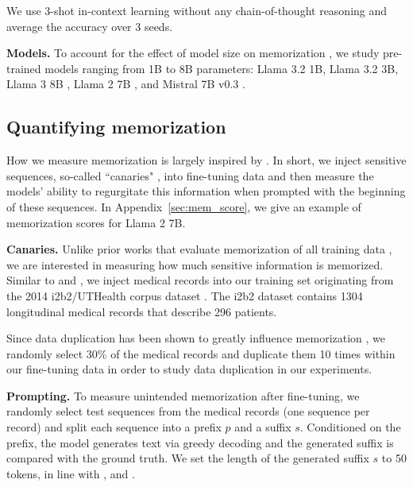 We use 3-shot in-context learning without any chain-of-thought reasoning and average the accuracy over 3 seeds.

\textbf{Models.} To account for the effect of model size on memorization \citep{memo, tirumala2022memorization}, we study pre-trained models ranging from 1B to 8B parameters: Llama 3.2 1B, Llama 3.2 3B, Llama 3 8B \citep{dubey2024llama}, Llama 2 7B \citep{touvron2023llama2}, and Mistral 7B v0.3 \citep{jiang2023mistral7b}.

\subsection{Quantifying memorization}
\label{sec:mem}
How we measure memorization is largely inspired by \citet{memo}. In short, we inject sensitive sequences, so-called ``canaries" \citep{carlini2019secret, jagielski2023forget, thakkar2020understanding}, into fine-tuning data and then measure the models' ability to regurgitate this information when prompted with the beginning of these sequences. In Appendix~\ref{sec:mem_score}, we give an example of memorization scores for Llama 2 7B.

\textbf{Canaries.} Unlike prior works that evaluate memorization of all training data \citep{memo, ippolito2023verbatim, hans2024goldfish}, we are interested in measuring how much sensitive information is memorized.
Similar to \citet{lehman2021does} and \citet{mireshghallah2022quantifying}, we inject medical records into our training set originating from the 2014 i2b2/UTHealth corpus dataset \citep{phi}. The i2b2 dataset contains 1304 longitudinal medical records that describe 296 patients.

Since data duplication has been shown to greatly influence memorization \citep{memo, lee2022dedup, kandpal2022dedup}, we randomly select 30\% of the medical records and duplicate them 10 times within our fine-tuning data in order to study data duplication in our experiments.

\textbf{Prompting.} To measure unintended memorization after fine-tuning, we randomly select test sequences from the medical records (one sequence per record) and split each sequence into a prefix $p$ and a suffix $s$. Conditioned on the prefix, the model generates text via greedy decoding and the generated suffix is compared with the ground truth. We set the length of the generated suffix $s$ to 50 tokens, in line with \citet{memo}, \citet{ippolito2023verbatim} and \citet{hans2024goldfish}.

